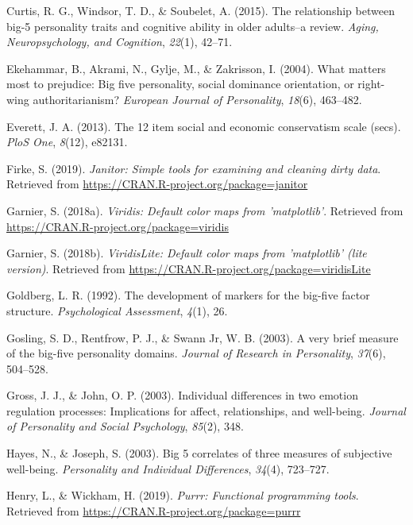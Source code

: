 \documentclass[man]{apa6}
\begin{document}
\hypertarget{ref-curtis2015relationship}{}
Curtis, R. G., Windsor, T. D., \& Soubelet, A. (2015). The relationship
between big-5 personality traits and cognitive ability in older
adults--a review. \emph{Aging, Neuropsychology, and Cognition},
\emph{22}(1), 42--71.

\hypertarget{ref-ekehammar2004matters}{}
Ekehammar, B., Akrami, N., Gylje, M., \& Zakrisson, I. (2004). What
matters most to prejudice: Big five personality, social dominance
orientation, or right-wing authoritarianism? \emph{European Journal of
Personality}, \emph{18}(6), 463--482.

\hypertarget{ref-everett201312}{}
Everett, J. A. (2013). The 12 item social and economic conservatism
scale (secs). \emph{PloS One}, \emph{8}(12), e82131.

\hypertarget{ref-R-janitor}{}
Firke, S. (2019). \emph{Janitor: Simple tools for examining and cleaning
dirty data}. Retrieved from
\url{https://CRAN.R-project.org/package=janitor}

\hypertarget{ref-R-viridis}{}
Garnier, S. (2018a). \emph{Viridis: Default color maps from
'matplotlib'}. Retrieved from
\url{https://CRAN.R-project.org/package=viridis}

\hypertarget{ref-R-viridisLite}{}
Garnier, S. (2018b). \emph{ViridisLite: Default color maps from
'matplotlib' (lite version)}. Retrieved from
\url{https://CRAN.R-project.org/package=viridisLite}

\hypertarget{ref-goldberg1992development}{}
Goldberg, L. R. (1992). The development of markers for the big-five
factor structure. \emph{Psychological Assessment}, \emph{4}(1), 26.

\hypertarget{ref-gosling2003very}{}
Gosling, S. D., Rentfrow, P. J., \& Swann Jr, W. B. (2003). A very brief
measure of the big-five personality domains. \emph{Journal of Research
in Personality}, \emph{37}(6), 504--528.

\hypertarget{ref-gross2003individual}{}
Gross, J. J., \& John, O. P. (2003). Individual differences in two
emotion regulation processes: Implications for affect, relationships,
and well-being. \emph{Journal of Personality and Social Psychology},
\emph{85}(2), 348.

\hypertarget{ref-hayes2003big}{}
Hayes, N., \& Joseph, S. (2003). Big 5 correlates of three measures of
subjective well-being. \emph{Personality and Individual Differences},
\emph{34}(4), 723--727.

\hypertarget{ref-R-purrr}{}
Henry, L., \& Wickham, H. (2019). \emph{Purrr: Functional programming
tools}. Retrieved from \url{https://CRAN.R-project.org/package=purrr}
\end{document}
